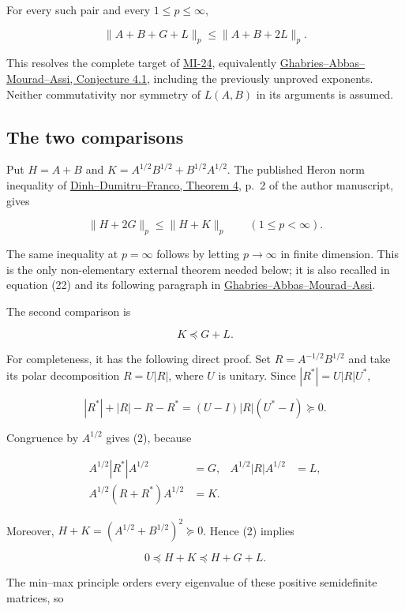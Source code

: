 \documentclass[10pt,a4paper]{article}
\begin{document}
For every such pair and every \(1\le p\le\infty\),

\[
\boxed{\|A+B+G+L\|_p\le\|A+B+2L\|_p.}
\]

This resolves the complete target of
\href{https://github.com/ajt60gaibb/OpenProblemsInNLA/blob/main/matrix-inequalities-and-norms/MI-24/README.md}{MI-24},
equivalently
\href{https://arxiv.org/html/2105.13356v1\#S4}{Ghabries--Abbas--Mourad--Assi,
Conjecture 4.1}, including the previously unproved exponents. Neither
commutativity nor symmetry of \(L(A,B)\) in its arguments is assumed.

\subsection{The two comparisons}\label{the-two-comparisons}

Put \(H=A+B\) and \(K=A^{1/2}B^{1/2}+B^{1/2}A^{1/2}\). The published
Heron norm inequality of
\href{https://trunghoamath.wordpress.com/wp-content/uploads/2017/06/p_t_q_t-4-2.pdf}{Dinh--Dumitru--Franco,
Theorem 4}, p.~2 of the author manuscript, gives

\[
\|H+2G\|_p\le\|H+K\|_p \qquad(1\le p<\infty). \tag{1}
\]

The same inequality at \(p=\infty\) follows by letting \(p\to\infty\) in
finite dimension. This is the only non-elementary external theorem
needed below; it is also recalled in equation (22) and its following
paragraph in
\href{https://arxiv.org/html/2105.13356v1\#S4}{Ghabries--Abbas--Mourad--Assi}.

The second comparison is

\[
K\preceq G+L. \tag{2}
\]

For completeness, it has the following direct proof. Set
\(R=A^{-1/2}B^{1/2}\) and take its polar decomposition \(R=U|R|\), where
\(U\) is unitary. Since \(|R^*|=U|R|U^*\),

\[
|R^*|+|R|-R-R^*=(U-I)|R|(U^*-I)\succeq0.
\]

Congruence by \(A^{1/2}\) gives (2), because

\[
\begin{aligned}
A^{1/2}|R^*|A^{1/2}&=G,&
A^{1/2}|R|A^{1/2}&=L,\\
A^{1/2}(R+R^*)A^{1/2}&=K.
\end{aligned}
\]

Moreover, \(H+K=(A^{1/2}+B^{1/2})^2\succeq0\). Hence (2) implies

\[
0\preceq H+K\preceq H+G+L.
\]

The min--max principle orders every eigenvalue of these positive
semidefinite matrices, so
\end{document}
